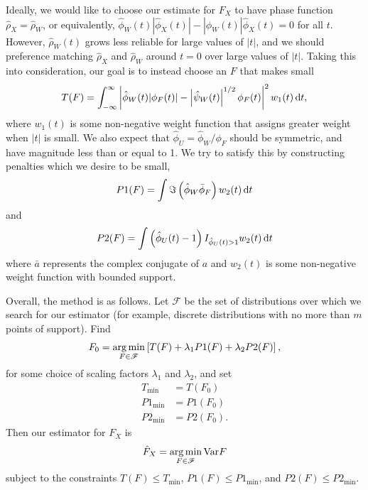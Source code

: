 	Ideally, we would like to choose our estimate for $F_X$ to have phase function $\hat{\rho}_X = \hat{\rho}_W$, or equivalently, $\hat{\phi}_W(t) |\hat{\phi}_X(t)| - |\hat{\phi}_W(t)| \hat{\phi}_X(t) = 0$ for all $t$. 
	However, $\hat{\rho}_W(t)$ grows less reliable for large values of $|t|$, and we should preference matching $\hat{\rho}_X$ and $\hat{\rho}_W$ around $t = 0$ over large values of $|t|$. Taking this into consideration, our goal is to instead choose an $F$ that makes small
	\begin{equation}
		T(F) = \int_{-\infty}^\infty \left| \hat{\phi}_W(t) |\phi_F(t)| - \left|\hat{\psi}_W(t)\right|^{1/2} \phi_F(t) \right|^2 w_1(t) \, \mathrm{d} t,
	\end{equation}
	where $w_1(t)$ is some non-negative weight function that assigns greater weight when $|t|$ is small. We also expect that $\hat{\phi}_U = \hat{\phi}_W / \phi_F$ should be symmetric, and have magnitude less than or equal to 1. We try to satisfy this by constructing penalties which we desire to be small,
	\begin{align}
		P1(F) = \int \Im \left(\hat{\phi}_W \bar{\phi}_F\right) w_2(t)\, \mathrm{d} t
		\label{eq:penalty1}
	\end{align}
	and
	\begin{align}
		P2(F) = \int \left(\hat{\phi}_U(t) - 1\right) I_{\hat{\phi}_U(t) > 1}  w_2(t) \, \mathrm{d} t
		\label{eq:penalty2}
	\end{align} 
	where $\bar{a}$ represents the complex conjugate of $a$ and $w_2(t)$ is some non-negative weight function with bounded support.

	Overall, the method is as follows. Let $\mathscr{F}$ be the set of distributions over which we search for our estimator (for example, discrete distributions with no more than $m$ points of support). Find
	\begin{equation}
		F_0 = \operatorname*{arg\,min}_{F \in \mathscr{F}} \left[T(F) + \lambda_1 P1(F) + \lambda_2 P2(F)\right],
		\label{eq:objective 1}
	\end{equation}
	for some choice of scaling factors $\lambda_1$ and $\lambda_2$, and set
	\begin{align}
		T_\mathrm{min} &= T(F_0)\\
		P1_\mathrm{min} &= P1(F_0)\\
		P2_\mathrm{min} &= P2(F_0).
	\end{align}
	Then our estimator for $F_X$ is
	\begin{equation}
		\hat{F}_X = \operatorname*{arg\,min}_{F \in \mathscr{F}} \mathrm{Var}{F}
	\end{equation}
	subject to the constraints $T(F) \leq T_\mathrm{min}$, $P1(F) \leq P1_\mathrm{min}$, and $P2(F) \leq P2_\mathrm{min}$.
	
